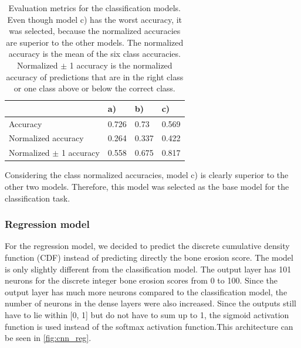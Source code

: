 \documentclass[12pt]{article}
\begin{document}
\begin{table}[ht]
\centering
\caption{Evaluation metrics for the classification models. Even though model c) has the worst accuracy, it was selected, because the normalized accuracies are superior to the other models. The normalized accuracy is the mean of the six class accuracies. Normalized $\pm$ 1 accuracy is the normalized accuracy of predictions that are in the right class or one class above or below the correct class.}
\label{tab:metrics_cla}
\begin{tabular}{@{}llll@{}}
\toprule
                                & a)    & b)    & c)    \\ \midrule
Accuracy                        & 0.726 & 0.73 & 0.569 \\
Normalized accuracy       & 0.264 & 0.337 & 0.422 \\
Normalized $\pm$ 1 accuracy  & 0.558 & 0.675 & 0.817 \\ \bottomrule
\end{tabular}
\end{table}

Considering the class normalized accuracies, model c) is clearly superior to the other two models. Therefore, this model was selected as the base model for the classification task.

\subsubsection{Regression model}
\label{subsubsec:reg}


For the regression model, we decided to predict the discrete cumulative density function (CDF) instead of predicting directly the bone erosion score. The model is only slightly different from the classification model. The output layer has 101 neurons for the discrete integer bone erosion scores from 0 to 100. Since the output layer has much more neurons compared to the classification model, the number of neurons in the dense layers were also increased. Since the outputs still have to lie within [0, 1] but do not have to sum up to 1, the sigmoid activation function is used instead of the softmax activation function.This architecture can be seen in \autoref{fig:cnn_reg}.
\end{document}
